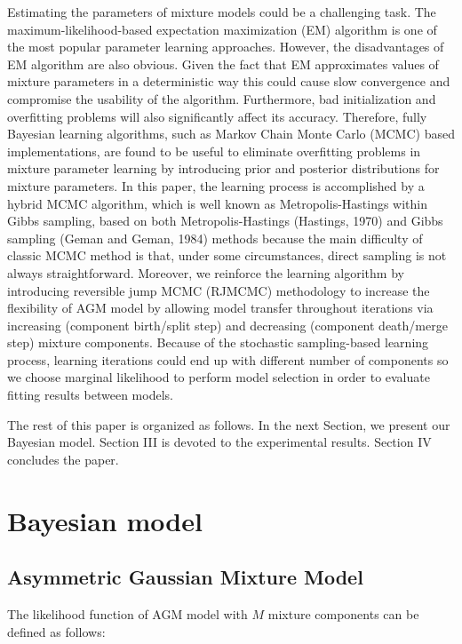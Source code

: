 \documentclass[conference]{IEEEtran}
\begin{document}
Estimating the parameters of mixture models could be a challenging task. The maximum-likelihood-based expectation maximization (EM) \cite{b3} algorithm is one of the most popular parameter learning approaches. However, the disadvantages of EM algorithm are also obvious. Given the fact that EM approximates values of mixture parameters in a deterministic way this could cause slow convergence and compromise the usability of the algorithm. Furthermore, bad initialization and overfitting problems\cite{b4} \cite{b5} will also significantly affect its accuracy. Therefore, fully Bayesian learning algorithms, such as Markov Chain Monte Carlo (MCMC) based implementations, are found to be useful to eliminate overfitting problems in mixture parameter learning by introducing prior and posterior distributions for mixture parameters. In this paper, the learning process is accomplished by a hybrid MCMC algorithm, which is well known as Metropolis-Hastings within Gibbs sampling\cite{b4}, based on both Metropolis-Hastings (Hastings, 1970)\cite{b6} and Gibbs sampling (Geman and Geman, 1984)\cite{b7} methods because the main difficulty of classic MCMC method is that, under some circumstances, direct sampling is not always straightforward. Moreover, we reinforce the learning algorithm by introducing reversible jump MCMC (RJMCMC)\cite{b5} methodology to increase the flexibility of AGM model by allowing model transfer throughout iterations via increasing (component birth/split step) and decreasing (component death/merge step) mixture components. Because of the stochastic sampling-based learning process, learning iterations could end up with different number of components so we choose marginal likelihood\cite{b4} to perform model selection in order to evaluate fitting results between models.

The rest of this paper is organized as follows. In the next Section, we present our Bayesian model. Section III is devoted to the experimental results. Section IV concludes the paper.


\section{Bayesian model}
\subsection{Asymmetric Gaussian Mixture Model}
The likelihood function of AGM model\cite{b2} with $M$ mixture components can be defined as follows:
\end{document}
